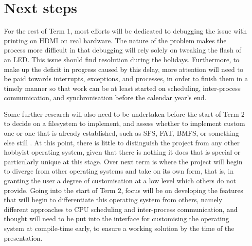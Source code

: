 \documentclass[10pt,a4paper]{article}
\begin{document}
\section*{Next steps}
For the rest of Term 1, most efforts will be dedicated to debugging the issue
with printing on HDMI on real hardware. The nature of the problem makes the
process more difficult in that debugging will rely solely on tweaking the flash
of an LED. This issue should find resolution during the holidays. Furthermore,
to make up the deficit in progress caused by this delay, more attention will
need to be paid towards interrupts, exceptions, and processes, in order to
finish them in a timely manner so that work can be at least started on
scheduling, inter-process communication, and synchronisation before the calendar
year's end.

Some further research will also need to be undertaken before the start of Term 2
to decide on a filesystem to implement, and assess whether to implement custom
one or one that is already established, such as SFS, FAT, BMFS, or something
else still \cite{Filesystems}. At this point, there is little to distinguish the
project from any other hobbyist operating system, given that there is nothing it
does that is special or particularly unique at this stage. Over next term is
where the project will begin to diverge from other operating systems and take on
its own form, that is, in granting the user a degree of customisation at a low
level which others do not provide. Going into the start of Term 2, focus will be
on developing the features that will begin to differentiate this operating
system from others, namely different approaches to CPU scheduling and
inter-process communication, and thought will need to be put into the
interface for customising the operating system at compile-time early, to ensure
a working solution by the time of the presentation.
\end{document}
